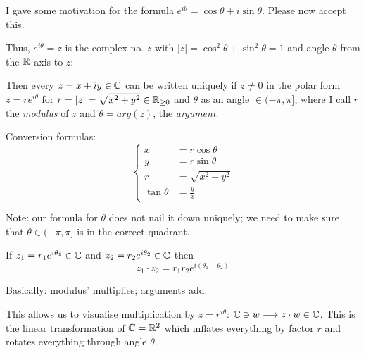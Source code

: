 \documentclass[twoside]{scrartcl}
\begin{document}
I gave some motivation for the formula
$e^{i\theta} = \cos\theta + i\sin\theta$. Please now accept this. 

Thus, $e^{i\theta} = z$ is the complex no. $z$ with $|z| = \cos^2 \theta + \sin^2\theta = 1$ and angle $\theta$ from the $\mathbb{R}$-axis to $z$: 

\begin{center}
\end{center}


Then every $z = x + iy \in\mathbb{C}$ can be written uniquely if $z \neq 0$ in the polar form $z = re^{i\theta}$ for $r = |z| = \sqrt{x^2 + y^2} \in\mathbb{R}_{\geq 0}$ and $\theta$ as an angle $\in (-\pi,\pi]$, where I call $r$ the \emph{modulus} of $z$ and $\theta = arg(z)$, the \emph{argument}. 

Conversion formulas: 
\[\begin{cases}
x &= r\cos\theta\\
y &= r \sin\theta\\[0.2cm]
r &= \sqrt{x^2 + y^2}\\
\tan \theta &= \frac{y}{x}
\end{cases}
\]\vspace*{5pt}

Note: our formula for $\theta$ does not nail it down uniquely; we need to make sure that $\theta \in (-\pi,\pi]$ is in the correct quadrant.

\pagebreak


\begin{theorem}
If $z_1 = r_1e^{i\theta_1} \in\mathbb{C}$ and $z_2 = r_2 e^{i\theta_2}\in\mathbb{C}$ then 
\[z_1 \cdot z_2 = r_1 r_2 e^{i(\theta_1 + \theta_2)}\]
\end{theorem}

Basically: modulus' multiplies; arguments add. 

This allows us to visualise multiplication by $z = r^{i\theta}$: $\mathbb{C} \ni w \longrightarrow z\cdot w \in\mathbb{C}$. This is the linear transformation of $\mathbb{C} = \mathbb{R}^2$ which inflates everything by factor $r$ and rotates everything through angle $\theta$.\\\\
\end{document}
